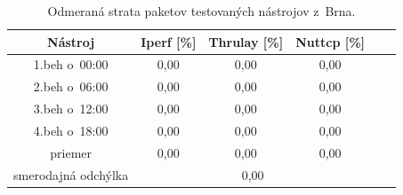     \begin{table}[h!]
        \begin{center}
            \begin{tabular}{|c|c|c|c|c|c|}
                \hline
                Nástroj & Iperf [\%]&  Thrulay [\%]& Nuttcp [\%]\\ 
                \hline
                1.beh o~00:00 & 0,00  & 0,00 & 0,00 \\
                \hline
                2.beh o~06:00 & 0,00 & 0,00 & 0,00 \\
                \hline
                3.beh o~12:00 & 0,00 & 0,00 & 0,00 \\
                \hline
                4.beh o~18:00 & 0,00 & 0,00 & 0,00 \\
                \hline
                priemer & 0,00 & 0,00 & 0,00 \\
                \hline
                smerodajná odchýlka & \multicolumn{3}{c|}{0,00}\\
                \hline
            \end{tabular}
            \caption{Odmeraná strata paketov testovaných nástrojov z~Brna.} 
            \label{tab_test_loss}
        \end{center}
    \end{table}

